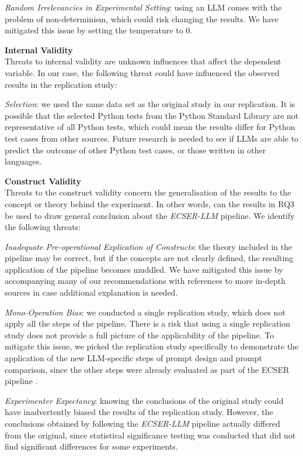 \documentclass[a4paper]{article}
\newcommand{\newecser}{\textit{ECSER-LLM} }
\begin{document}
\textit{Random Irrelevancies in Experimental Setting}: using an LLM comes with the problem of non-determinism, which could risk changing the results. We have mitigated this issue by setting the temperature to 0.

\textbf{Internal Validity}\\
Threats to internal validity are unknown influences that affect the dependent variable. In our case, the following threat could have influenced the observed results in the replication study:

\textit{Selection}: we used the same data set as the original study in our replication. It is possible that the selected Python tests from the Python Standard Library are not representative of all Python tests, which could mean the results differ for Python test cases from other sources. Future research is needed to see if LLMs are able to predict the outcome of other Python test cases, or those written in other languages.

\textbf{Construct Validity}\\
Threats to the construct validity concern the generalisation of the results to the concept or theory behind the experiment. In other words, can the results in RQ3 be used to draw general conclusion about the \newecser pipeline. We identify the following threats:

\textit{Inadequate Pre-operational Explication of Constructs}: the theory included in the pipeline may be correct, but if the concepts are not clearly defined, the resulting application of the pipeline becomes muddled. We have mitigated this issue by accompanying many of our recommendations with references to more in-depth sources in case additional explanation is needed.

\textit{Mono-Operation Bias}: we conducted a single replication study, which does not apply all the steps of the pipeline. There is a risk that using a single replication study does not provide a full picture of the applicability of the pipeline. To mitigate this issue, we picked the replication study specifically to demonstrate the application of the new LLM-specific steps of prompt design and prompt comparison, since the other steps were already evaluated as part of the ECSER pipeline \cite{Dellanna2022}. 

\textit{Experimenter Expectancy}: knowing the conclusions of the original study could have inadvertently biased the results of the replication study. However, the conclusions obtained by following the \newecser pipeline actually differed from the original, since statistical significance testing was conducted that did not find significant differences for some experiments. 
\end{document}
